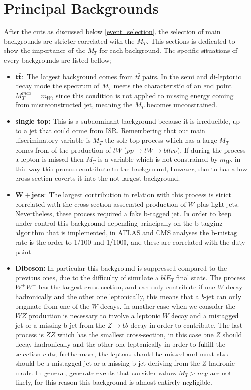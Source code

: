 \section{Principal Backgrounds}
\noindent After the cuts as discussed below \ref{event_selection}, the selection of main backgrounds are stricter correlated with the $M_{T}$. This sections is dedicated to show the importance of the $M_{T}$ for each background. The specific situations of every backgrounds are listed bellow;

\begin{itemize}
\item $\mathbf{t\bar{t}:}$ The largest background comes from $t\bar{t}$ pairs. In the semi and di-leptonic decay mode the spectrum of $M_{T}$ meets the characteristic of an end point $M_{T}^{max}=m_{W}$, since this condition is not applied to missing energy coming from misreconstructed jet, meaning the $M_{T}$ becomes unconstrained. 
\item \textbf{single top:} This is a subdominant background because it is irreducible, up to a jet that could come from ISR. Remembering that our main discriminatory variable is $M_{T}$ the sole top process which has a large $M_{T}$ comes from of the production of $tW$ ($pp\rightarrow tW\rightarrow bll\nu \nu$). If during the process a lepton is missed then $M_{T}$ is a variable which is not constrained by $m_{W}$, in this way this process contribute to the background, however, due to has a low cross-section coverts it into the not largest background.
\item $\mathbf{W+jets:}$ The largest contribution in relation with this process is strict correlated with the cross-section associated production of $W$ plus light jets. Nevertheless, these process required a fake b-tagged jet. In order to keep under control this background depending principally on the b-tagging algorithm that is implemented, in ATLAS and CMS analyses the b-mistag rate is the order to  1/100 and 1/1000, and these are correlated with the duty point.
\item \textbf{Diboson:} In particular this background is suppressed compared to the previous ones, due to the difficulty of simulate a $blE_{T}$ final state. The process $W^{+}W^{-}$ has the largest cross-section, and can only contribute if one $W$ decay hadronically and the other one leptonically, this means that a $b$-jet can only originate from one of the $W$ decays. In another case when we consider the $WZ$ production is necessary to involve a leptonic $W$ decay and a mistagged jet or a missing b jet from the $Z\rightarrow b\bar{b}$ decay in order to contribute. The last process is $ZZ$ which has the smallest cross-section, in this case one $Z$ should decay hadronically and the other one leptonically in order to fulfill the selection cuts; furthermore, the leptons should be missed and must also should be a mistagged jet or a missing b jet deriving from the $Z$ hadronic mode. In general, generate events that consider values $M_{T}>m_{W}$ are not likely, for this reason this background is almost entirely negligible.

\end{itemize}

